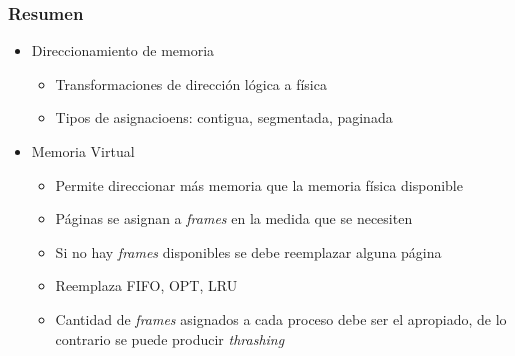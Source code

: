 \documentclass[letter]{beamer}
\begin{document}
\begin{frame}
  \frametitle{Resumen}

  \begin{itemize}
    \item Direccionamiento de memoria
      \begin{itemize}
        \item Transformaciones de dirección lógica a física
        \item Tipos de asignacioens: contigua, segmentada, paginada
      \end{itemize}
    \item Memoria Virtual
      \begin{itemize}
        \item Permite direccionar más memoria que la memoria física disponible
        \item Páginas se asignan a {\em frames} en la medida que se necesiten
        \item Si no hay {\em frames} disponibles se debe reemplazar alguna página
        \item Reemplaza FIFO, OPT, LRU
        \item Cantidad de {\em frames} asignados a cada proceso debe ser el apropiado,
              de lo contrario se puede producir {\em thrashing}
      \end{itemize}
  \end{itemize}

\end{frame}
\end{document}
